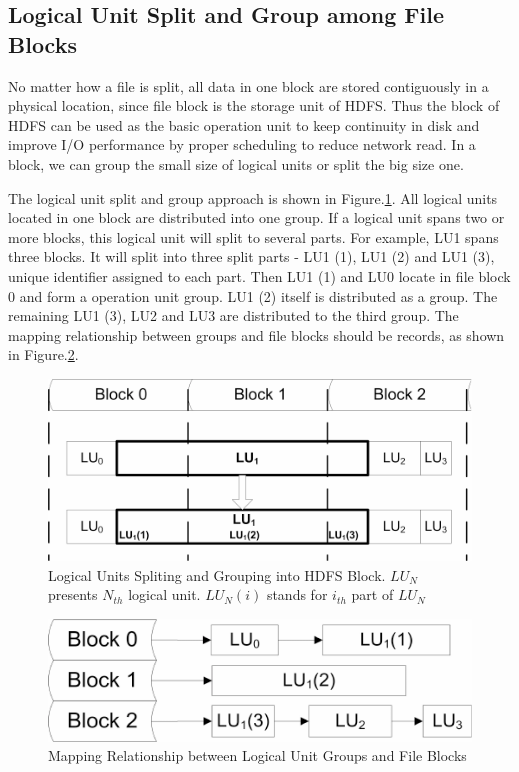 \documentclass[preprint,12pt]{elsarticle}
\begin{document}
\subsection{Logical Unit Split and Group among File Blocks}
No matter how a file is split, all data in one block are stored contiguously in a physical location, since file block is the storage
unit of HDFS. Thus the block of HDFS can be used as the basic operation unit to keep continuity in disk and improve I/O performance 
by proper scheduling to reduce network read. In a block, we can group the small size of logical units or split the big size one.\par
The logical unit split and group approach is shown in Figure.\ref{figure2}. All logical units located in one block are distributed 
into one group. If a logical unit spans two or more blocks, this logical unit will split to several parts. For example, LU1 spans three 
blocks. It will split into three split parts - LU1 (1), LU1 (2) and LU1 (3), unique identifier assigned to each part. Then LU1 (1) 
and LU0 locate in file block 0 and form a operation unit group. LU1 (2) itself is distributed as a group. The remaining LU1 (3), LU2 
and LU3 are distributed to the third group. The mapping relationship between groups and file blocks should be records, as shown in 
Figure.\ref{figure3}. \par

\begin{figure}
	\centering
	\includegraphics{figure2}
	\caption{Logical Units Spliting and Grouping into HDFS Block. $LU_N$ presents $N_{th}$ logical unit. $LU_N(i)$ stands for 
			$i_{th}$ part of $LU_N$}
	\label{figure2}
\end{figure}

\begin{figure}
	\centering
	\includegraphics{figure3}
	\caption{Mapping Relationship between Logical Unit Groups and File Blocks}
	\label{figure3}
\end{figure}
\end{document}
